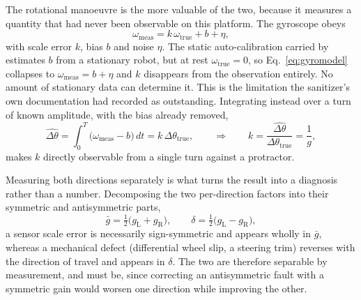 The rotational manoeuvre is the more valuable of the two, because it
measures a quantity that had never been observable on this platform. The
gyroscope obeys
\begin{equation}
\omega_{\text{meas}}=k\,\omega_{\text{true}}+b+\eta,
\label{eq:gyromodel}
\end{equation}
with scale error $k$, bias $b$ and noise $\eta$. The static
auto-calibration carried by  estimates $b$ from a
stationary robot, but at rest $\omega_{\text{true}}=0$, so Eq.~\ref{eq:gyromodel}
collapses to $\omega_{\text{meas}}=b+\eta$ and $k$ disappears from the
observation entirely. No amount of stationary data can determine it. This is
the limitation the sanitizer's own documentation had recorded as
outstanding. Integrating instead over a turn of known amplitude, with the
bias already removed,
\begin{equation}
\widehat{\Delta\theta}=\int_{0}^{T}\!\bigl(\omega_{\text{meas}}-b\bigr)\,dt
 = k\,\Delta\theta_{\text{true}},
\qquad\Longrightarrow\qquad
k=\frac{\widehat{\Delta\theta}}{\Delta\theta_{\text{true}}}=\frac{1}{g},
\label{eq:gyroscale}
\end{equation}
makes $k$ directly observable from a single turn against a protractor.

Measuring both directions separately is what turns the result into a
diagnosis rather than a number. Decomposing the two per-direction factors
into their symmetric and antisymmetric parts,
\begin{equation}
\bar g=\tfrac12\bigl(g_{\text{L}}+g_{\text{R}}\bigr),
\qquad
\delta=\tfrac12\bigl(g_{\text{L}}-g_{\text{R}}\bigr),
\label{eq:symantisym}
\end{equation}
a sensor scale error is necessarily sign-symmetric and appears wholly in
$\bar g$, whereas a mechanical defect (differential wheel slip, a
steering trim) reverses with the direction of travel and appears in
$\delta$. The two are therefore separable by measurement, and must be, since
correcting an antisymmetric fault with a symmetric gain would worsen one
direction while improving the other.

